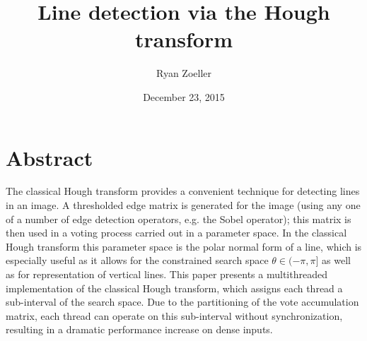 \documentclass[letterpaper,12pt,titlepage]{article}
\title{Line detection via the Hough transform}
\date{December 23, 2015}
\author{Ryan Zoeller}
\begin{document}
\maketitle
\newpage

\section{Abstract}
The classical Hough transform provides a convenient technique for detecting lines in an image.
A thresholded edge matrix is generated for the image (using any one of a number of edge detection
operators, e.g. the Sobel operator); this matrix is then used in a voting process carried
out in a parameter space. In the classical Hough transform this parameter space is the polar
normal form of a line, which is especially useful as it allows for the constrained
search space $\theta \in (-\pi,\pi]$ as well as for representation of vertical lines.
This paper presents a multithreaded implementation of the classical Hough transform, which assigns
each thread a sub-interval of the search space. Due to the partitioning of the vote accumulation
matrix, each thread can operate on this sub-interval without synchronization, resulting in a dramatic
performance increase on dense inputs.
\end{document}
